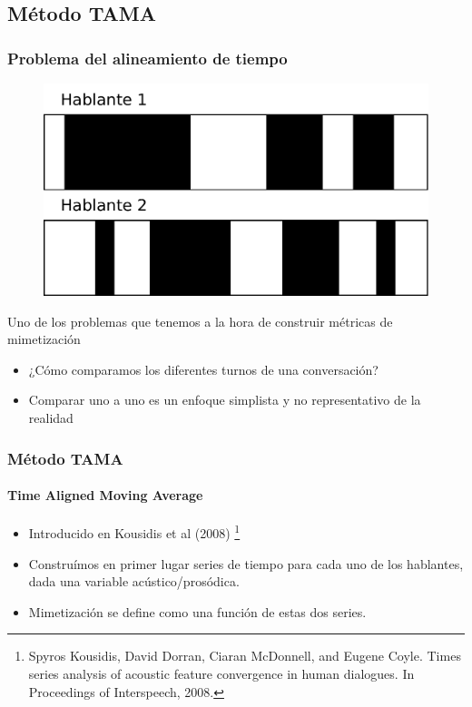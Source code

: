 \subsection{Método TAMA}

\begin{frame}
  \frametitle{Problema del alineamiento de tiempo}

  \begin{figure}[t]
    \includegraphics[scale=0.40]{images/conversation_turns.pdf}
  \end{figure}
  Uno de los problemas que tenemos a la hora de construir métricas de mimetización

  \begin{itemize}
    \item ¿Cómo comparamos los diferentes turnos de una conversación?
    \item Comparar uno a uno es un enfoque simplista y no representativo de la realidad
  \end{itemize}
\end{frame}



\begin{frame}
  \frametitle{Método TAMA}
  \framesubtitle{Time Aligned Moving Average}
  \begin{itemize}
    \item Introducido en Kousidis et al (2008) \footnote{Spyros Kousidis, David Dorran, Ciaran McDonnell, and Eugene Coyle. Times series analysis of acoustic feature convergence in human dialogues. In
Proceedings of Interspeech, 2008.}
    \item Construímos en primer lugar series de tiempo para cada uno de los hablantes, dada una variable acústico/prosódica.
    \item Mimetización se define como una función de estas dos series.
  \end{itemize}
\end{frame}


